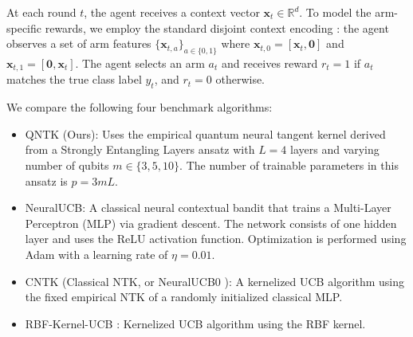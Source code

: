 \documentclass[pdflatex,sn-mathphys-num]{sn-jnl}%
\theoremstyle{thmstyleone}%
\theoremstyle{thmstyletwo}%
\theoremstyle{thmstylethree}%
\newcommand{\xbf}{\mathbf{x}}
\begin{document}
At each round $t$, the agent receives a context vector $\xbf_t \in \mathbb{R}^d$. To model the arm-specific rewards, we employ the standard disjoint context encoding \cite{li2010contextual}: the agent observes a set of arm features $\{\xbf_{t,a}\}_{a \in \{0,1\}}$ where $\xbf_{t,0} = [\xbf_t, \mathbf{0}]$ and $\xbf_{t,1} = [\mathbf{0}, \xbf_t]$. The agent selects an arm $a_t$ and receives reward $r_t = 1$ if $a_t$ matches the true class label $y_t$, and $r_t = 0$ otherwise. %

We compare the following four benchmark algorithms:
\begin{itemize}
    \item QNTK (Ours): Uses the empirical quantum neural tangent kernel derived from a Strongly Entangling Layers ansatz with $L=4$ layers and varying number of qubits $m \in \{3, 5, 10\}$. The number of trainable parameters in this ansatz is $p = 3mL$.
    \item NeuralUCB: A classical neural contextual bandit that trains a Multi-Layer Perceptron (MLP) via gradient descent. The network consists of one hidden layer and uses the ReLU activation function. Optimization is performed using Adam with a learning rate of $\eta = 0.01$. %
    \item CNTK (Classical NTK, or NeuralUCB0 \cite{neuralucb}): A kernelized UCB algorithm using the fixed empirical NTK of a randomly initialized classical MLP.
    \item RBF-Kernel-UCB \cite{valko2013finite}: Kernelized UCB algorithm using the RBF kernel.
\end{itemize}

\end{document}
